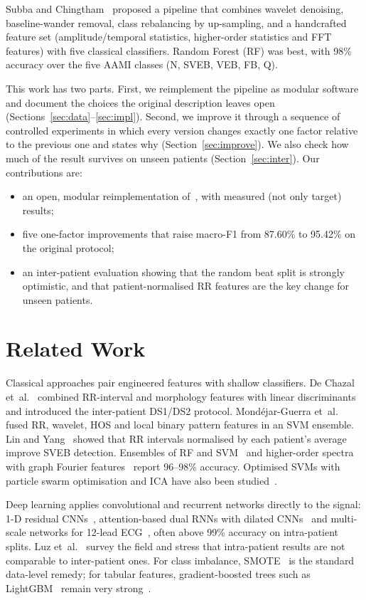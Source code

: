 \documentclass[journal]{IEEEtran}
\begin{document}
Subba and Chingtham~\cite{subba2024} proposed a pipeline that combines wavelet denoising, baseline-wander removal, class rebalancing by up-sampling, and a handcrafted feature set (amplitude/temporal statistics, higher-order statistics and FFT features) with five classical classifiers. Random Forest (RF) was best, with 98\% accuracy over the five AAMI classes (N, SVEB, VEB, FB, Q).

This work has two parts. First, we reimplement the pipeline as modular software and document the choices the original description leaves open (Sections~\ref{sec:data}--\ref{sec:impl}). Second, we improve it through a sequence of controlled experiments in which every version changes exactly one factor relative to the previous one and states why (Section~\ref{sec:improve}). We also check how much of the result survives on unseen patients (Section~\ref{sec:inter}). Our contributions are:
\begin{itemize}
\item an open, modular reimplementation of~\cite{subba2024}, with measured (not only target) results;
\item five one-factor improvements that raise macro-F1 from 87.60\% to 95.42\% on the original protocol;
\item an inter-patient evaluation showing that the random beat split is strongly optimistic, and that patient-normalised RR features are the key change for unseen patients.
\end{itemize}

\section{Related Work}
Classical approaches pair engineered features with shallow classifiers. De Chazal et~al.~\cite{dechazal2004} combined RR-interval and morphology features with linear discriminants and introduced the inter-patient DS1/DS2 protocol. Mondéjar-Guerra et~al.~\cite{mondejar2019} fused RR, wavelet, HOS and local binary pattern features in an SVM ensemble. Lin and Yang~\cite{lin2014} showed that RR intervals normalised by each patient's average improve SVEB detection. Ensembles of RF and SVM~\cite{bhattacharyya2021} and higher-order spectra with graph Fourier features~\cite{liu2020} report 96--98\% accuracy. Optimised SVMs with particle swarm optimisation and ICA have also been studied~\cite{ramkumar2021}.

Deep learning applies convolutional and recurrent networks directly to the signal: 1-D residual CNNs~\cite{khan2023}, attention-based dual RNNs with dilated CNNs~\cite{islam2023} and multi-scale networks for 12-lead ECG~\cite{zhang2024}, often above 99\% accuracy on intra-patient splits. Luz et~al.~\cite{luz2016} survey the field and stress that intra-patient results are not comparable to inter-patient ones. For class imbalance, SMOTE~\cite{chawla2002} is the standard data-level remedy; for tabular features, gradient-boosted trees such as LightGBM~\cite{ke2017} remain very strong~\cite{grinsztajn2022}.
\end{document}
